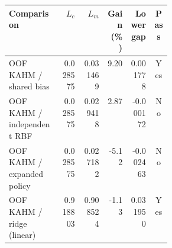\begin{tabular}{@{}p{0.32\linewidth}rrrrc@{}}
\toprule
Comparison & $L_c$ & $L_m$ & Gain (\%) & Lower gap & Pass \\
\midrule
OOF KAHM / shared bias & 0.028575 & 0.031469 & 9.20 & 0.001778 & Yes \\
OOF KAHM / independent RBF & 0.028575 & 0.029418 & 2.87 & -0.000172 & No \\
OOF KAHM / expanded policy & 0.028575 & 0.027182 & -5.12 & -0.002463 & No \\
OOF KAHM / ridge (linear) & 0.918803 & 0.908524 & -1.13 & 0.031950 & Yes \\
\bottomrule
\end{tabular}
